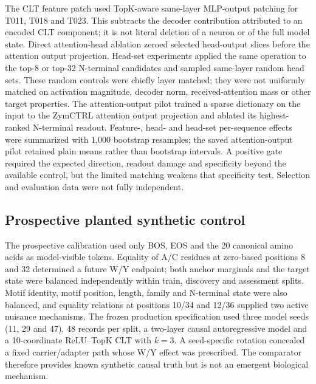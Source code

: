 \documentclass[pdflatex,sn-nature]{sn-jnl}
\begin{document}
The CLT feature patch used TopK-aware same-layer MLP-output patching for T011, T018 and T023. This subtracts the decoder contribution attributed to an encoded CLT component; it is not literal deletion of a neuron or of the full model state. Direct attention-head ablation zeroed selected head-output slices before the attention output projection. Head-set experiments applied the same operation to the top-8 or top-32 N-terminal candidates and sampled same-layer random head sets. These random controls were chiefly layer matched; they were not uniformly matched on activation magnitude, decoder norm, received-attention mass or other target properties. The attention-output pilot trained a sparse dictionary on the input to the ZymCTRL attention output projection and ablated its highest-ranked N-terminal readout. Feature-, head- and head-set per-sequence effects were summarized with 1,000 bootstrap resamples; the saved attention-output pilot retained plain means rather than bootstrap intervals. A positive gate required the expected direction, readout damage and specificity beyond the available control, but the limited matching weakens that specificity test. Selection and evaluation data were not fully independent.

\subsection{Prospective planted synthetic control}

The prospective calibration used only BOS, EOS and the 20 canonical amino acids as model-visible tokens. Equality of A/C residues at zero-based positions 8 and 32 determined a future W/Y endpoint; both anchor marginals and the target state were balanced independently within train, discovery and assessment splits. Motif identity, motif position, length, family and N-terminal state were also balanced, and equality relations at positions 10/34 and 12/36 supplied two active nuisance mechanisms. The frozen production specification used three model seeds (11, 29 and 47), 48 records per split, a two-layer causal autoregressive model and a 10-coordinate ReLU--TopK CLT with $k=3$. A seed-specific rotation concealed a fixed carrier/adapter path whose W/Y effect was prescribed. The comparator therefore provides known synthetic causal truth but is not an emergent biological mechanism.
\end{document}
